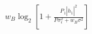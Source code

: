 \documentclass[preview]{standalone}
\begin{document}
\begin{align*}
w_B \log_2 \left[1 + \frac{P_1 \left|\hat{h_1}\right|^2}{P \sigma_{\epsilon}^2 + w_B \sigma^2}\right]
\end{align*}
\end{document}
